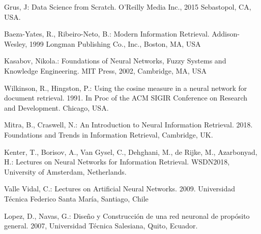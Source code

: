 \documentclass{llncs}
\begin{document}
\begin{thebibliography}{1}

Grus, J:
Data Science from Scratch.
O'Reilly Media Inc., 2015
Sebastopol, CA, USA.

Baeza-Yates, R., Ribeiro-Neto, B.:
Modern Information Retrieval.
Addison-Wesley, 1999
Longman Publishing Co., Inc., Boston, MA, USA

Kasabov, Nikola.:
Foundations of Neural Networks, Fuzzy Systems and Knowledge Engineering.
MIT Press, 2002, Cambridge, MA, USA

Wilkinson, R., Hingston, P.:
Using the cosine measure in a neural network for document retrieval. 1991.
In Proc of the ACM SIGIR Conference on Research and Development. Chicago, USA.

Mitra, B., Craswell, N.:
An Introduction to Neural Information Retrieval. 2018.
Foundations and Trends in Information Retrieval, Cambridge, UK.

Kenter, T., Borisov, A., Van Gysel, C., Dehghani, M., de Rijke, M., Azarbonyad, H.:
Lectures on Neural Networks for Information Retrieval.
WSDN2018, University of Amsterdam, Netherlands.

Valle Vidal, C.:
Lectures on Artificial Neural Networks. 2009.
Universidad T\'ecnica Federico Santa Mar\'ia, Santiago, Chile

Lopez, D., Navas, G.:
Dise\~no y Construcci\'on de una red neuronal de prop\'osito general.
2007, Universidad T\'ecnica Salesiana, Quito, Ecuador.

\end{thebibliography}
\end{document}
